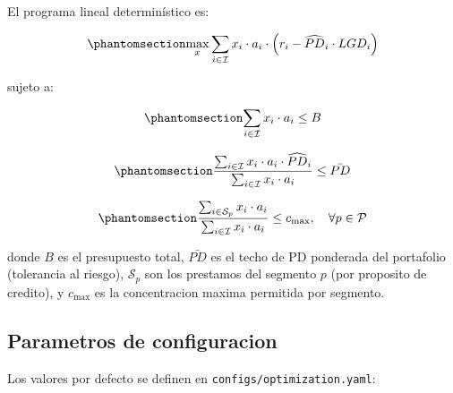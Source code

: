 \documentclass[
  spanish,
  11pt,
  letterpaper,
]{scrbook}
\theoremstyle{plain}
\theoremstyle{remark}
\begin{document}
El programa lineal determinístico es:

\begin{equation}\protect\phantomsection\label{eq-deterministic-objective}{
\max_{x} \sum_{i \in \mathcal{I}} x_i \cdot a_i \cdot \left( r_i - \widehat{PD}_i \cdot LGD_i \right)
}\end{equation}

sujeto a:

\begin{equation}\protect\phantomsection\label{eq-budget-constraint}{
\sum_{i \in \mathcal{I}} x_i \cdot a_i \leq B
}\end{equation}

\begin{equation}\protect\phantomsection\label{eq-pd-cap-constraint}{
\frac{\sum_{i \in \mathcal{I}} x_i \cdot a_i \cdot \widehat{PD}_i}{\sum_{i \in \mathcal{I}} x_i \cdot a_i} \leq \bar{PD}
}\end{equation}

\begin{equation}\protect\phantomsection\label{eq-concentration-constraint}{
\frac{\sum_{i \in \mathcal{S}_p} x_i \cdot a_i}{\sum_{i \in \mathcal{I}} x_i \cdot a_i} \leq c_{\max}, \quad \forall p \in \mathcal{P}
}\end{equation}

donde \(B\) es el presupuesto total, \(\bar{PD}\) es el techo de PD
ponderada del portafolio (tolerancia al riesgo), \(\mathcal{S}_p\) son
los prestamos del segmento \(p\) (por proposito de credito), y
\(c_{\max}\) es la concentracion maxima permitida por segmento.

\subsection{Parametros de
configuracion}\label{parametros-de-configuracion}

Los valores por defecto se definen en
\texttt{configs/optimization.yaml}:
\end{document}

